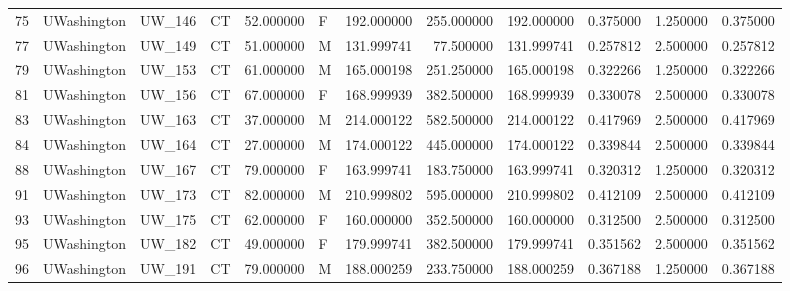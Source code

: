 \begin{tabular}{llllrlrrrrrr}
75     &     UWashington &       UW\_146 &                 CT &  52.000000 &        F &       192.000000 &    255.000000 &  192.000000 &               0.375000 &            1.250000 &          0.375000 \\
77     &     UWashington &       UW\_149 &                 CT &  51.000000 &        M &       131.999741 &     77.500000 &  131.999741 &               0.257812 &            2.500000 &          0.257812 \\
79     &     UWashington &       UW\_153 &                 CT &  61.000000 &        M &       165.000198 &    251.250000 &  165.000198 &               0.322266 &            1.250000 &          0.322266 \\
81     &     UWashington &       UW\_156 &                 CT &  67.000000 &        F &       168.999939 &    382.500000 &  168.999939 &               0.330078 &            2.500000 &          0.330078 \\
83     &     UWashington &       UW\_163 &                 CT &  37.000000 &        M &       214.000122 &    582.500000 &  214.000122 &               0.417969 &            2.500000 &          0.417969 \\
84     &     UWashington &       UW\_164 &                 CT &  27.000000 &        M &       174.000122 &    445.000000 &  174.000122 &               0.339844 &            2.500000 &          0.339844 \\
88     &     UWashington &       UW\_167 &                 CT &  79.000000 &        F &       163.999741 &    183.750000 &  163.999741 &               0.320312 &            1.250000 &          0.320312 \\
91     &     UWashington &       UW\_173 &                 CT &  82.000000 &        M &       210.999802 &    595.000000 &  210.999802 &               0.412109 &            2.500000 &          0.412109 \\
93     &     UWashington &       UW\_175 &                 CT &  62.000000 &        F &       160.000000 &    352.500000 &  160.000000 &               0.312500 &            2.500000 &          0.312500 \\
95     &     UWashington &       UW\_182 &                 CT &  49.000000 &        F &       179.999741 &    382.500000 &  179.999741 &               0.351562 &            2.500000 &          0.351562 \\
96     &     UWashington &       UW\_191 &                 CT &  79.000000 &        M &       188.000259 &    233.750000 &  188.000259 &               0.367188 &            1.250000 &          0.367188 \\

\end{tabular}
